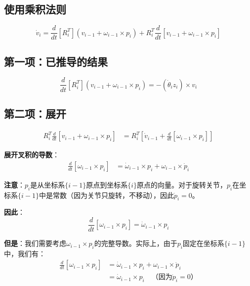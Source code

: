 \documentclass[12pt,a4paper]{article}
\begin{document}
\subsection{使用乘积法则}

\begin{equation}
\dot{v}_i = \frac{d}{dt}[R_i^T] (v_{i-1} + \omega_{i-1} \times p_i) + R_i^T \frac{d}{dt}[v_{i-1} + \omega_{i-1} \times p_i]
\end{equation}

\subsection{第一项：已推导的结果}

\begin{equation}
\frac{d}{dt}[R_i^T] (v_{i-1} + \omega_{i-1} \times p_i) = -(\dot{\theta}_i z_i) \times v_i
\end{equation}

\subsection{第二项：展开}

\begin{align}
R_i^T \frac{d}{dt}[v_{i-1} + \omega_{i-1} \times p_i] &= R_i^T \left[\dot{v}_{i-1} + \frac{d}{dt}[\omega_{i-1} \times p_i]\right]
\end{align}

\textbf{展开叉积的导数}：
\begin{align}
\frac{d}{dt}[\omega_{i-1} \times p_i] &= \dot{\omega}_{i-1} \times p_i + \omega_{i-1} \times \dot{p}_i
\end{align}

\textbf{注意}：$p_i$是从坐标系$\{i-1\}$原点到坐标系$\{i\}$原点的向量。对于旋转关节，$p_i$在坐标系$\{i-1\}$中是常数（因为关节只旋转，不移动），因此$\dot{p}_i = 0$。

\textbf{因此}：
\begin{equation}
\frac{d}{dt}[\omega_{i-1} \times p_i] = \dot{\omega}_{i-1} \times p_i
\end{equation}

\textbf{但是}：我们需要考虑$\omega_{i-1} \times p_i$的完整导数。实际上，由于$p_i$固定在坐标系$\{i-1\}$中，我们有：
\begin{align}
\frac{d}{dt}[\omega_{i-1} \times p_i] &= \dot{\omega}_{i-1} \times p_i + \omega_{i-1} \times \dot{p}_i \\
&= \dot{\omega}_{i-1} \times p_i \quad \text{（因为$\dot{p}_i = 0$）}
\end{align}
\end{document}
